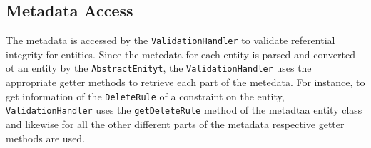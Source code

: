 	\subsection{Metadata Access}
	The metadata is accessed by the \texttt{ValidationHandler} to
	validate referential integrity for entities. Since the metedata for each entity is
	parsed and converted ot an entity by the \texttt{AbstractEnityt}, 
	the \texttt{ValidationHandler} uses the appropriate getter methods to retrieve
	each part of the metedata. For instance, to get information of
	the \texttt{DeleteRule} of a constraint on the entity,
	\texttt{ValidationHandler} uses the \texttt{getDeleteRule} method of the
	metadtaa entity class and likewise for all the other different parts
	of the metadata respective getter methods are used.
	
